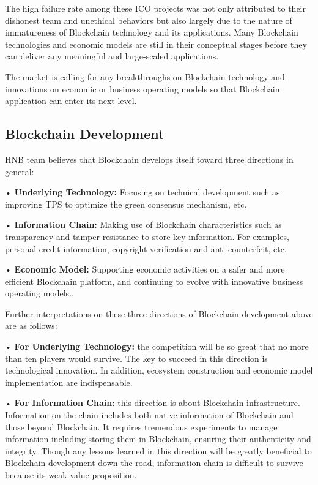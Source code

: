 \documentclass[fleqn,10pt]{SelfArx} %
\begin{document}
The high failure rate among these ICO projects was not only attributed to their dishonest team and unethical behaviors but also largely due to the nature of immatureness of Blockchain technology and its applications. Many Blockchain technologies and economic models are still in their conceptual stages before they can deliver any meaningful and large-scaled applications. 

The market is calling for any breakthroughs on Blockchain technology and innovations on economic or business operating models so that Blockchain application can enter its next level. \\ 

\subsection{Blockchain Development}

HNB team believes that Blockchain develops itself toward three directions in general: 

•   \textbf{Underlying Technology: }Focusing on technical development such as improving TPS to optimize the green consensus mechanism, etc.

•	\textbf{Information Chain: }Making use of Blockchain characteristics such as transparency and tamper-resistance to store key information. For examples, personal credit information, copyright verification and anti-counterfeit, etc.

•	\textbf{Economic Model: }Supporting economic activities on a safer and more efficient Blockchain platform, and continuing to evolve with innovative business operating models.. 

Further interpretations on these three directions of Blockchain development above are as follows:

•	\textbf{For Underlying Technology: }the competition will be so great that no more than ten players would survive. The key to succeed in this direction is technological innovation. In addition, ecosystem construction and economic model implementation are indispensable.

•	\textbf{For Information Chain: }this direction is about Blockchain infrastructure. Information on the chain includes both native information of Blockchain and those beyond Blockchain. It requires tremendous experiments to manage information including storing them in Blockchain, ensuring their authenticity and integrity. Though any lessons learned in this direction will be greatly beneficial to Blockchain development down the road, information chain is difficult to survive because its weak value proposition.
\end{document}
